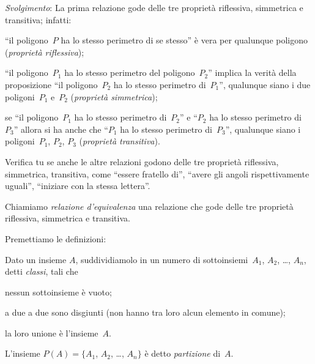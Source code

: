 \begin{exrig}
\begin{esempio}
\emph{Svolgimento}: La prima relazione gode delle tre proprietà riflessiva, simmetrica e transitiva; infatti:

\begin{itemize*}
\item ``il poligono~$P$ ha lo stesso perimetro di se stesso'' è vera per qualunque poligono (\emph{proprietà riflessiva});
\item ``il poligono~$P_1$ ha lo stesso perimetro del poligono~$P_2$'' implica la verità della proposizione ``il
poligono~$P_2$ ha lo stesso perimetro di~$P_1$'', qualunque siano i due poligoni~$P_1$ e~$P_2$ (\emph{proprietà
simmetrica});
\item se ``il poligono~$P_1$ ha lo stesso perimetro di~$P_2$'' e ``$P_2$ ha lo stesso perimetro di~$P_3$'' allora si ha anche che ``$P_1$ ha lo stesso
perimetro di~$P_3$'', qualunque siano i poligoni~$P_1$, $P_2$, $P_3$ (\emph{proprietà transitiva}).
\end{itemize*}

Verifica tu se anche le altre relazioni godono delle tre proprietà riflessiva, simmetrica, transitiva, come
``essere fratello di'', ``avere gli angoli rispettivamente uguali'', ``iniziare con la stessa lettera''.
 \end{esempio}
\end{exrig}

\begin{definizione}
Chiamiamo \emph{relazione d'equivalenza} una relazione che gode delle tre proprietà riflessiva, simmetrica e transitiva.
\end{definizione}

\ovalbox{\risolvi \ref{ese:7.26}}

\pagebreak

Premettiamo le definizioni:

\begin{definizione}
Dato un insieme $A$, suddividiamolo in un numero di sottoinsiemi~$A_1$, $A_2$, \ldots, $A_n$, detti \emph{classi}, tali che
\begin{enumeratea}
\item nessun sottoinsieme è vuoto;
\item a due a due sono disgiunti (non hanno tra loro alcun elemento in comune);
\item la loro unione è l'insieme~$A$.
\end{enumeratea}
L'insieme $P(A) = \{A_1$, $A_2$, \ldots, $A_n\}$ è detto \emph{partizione} di~$A$.
\end{definizione}

